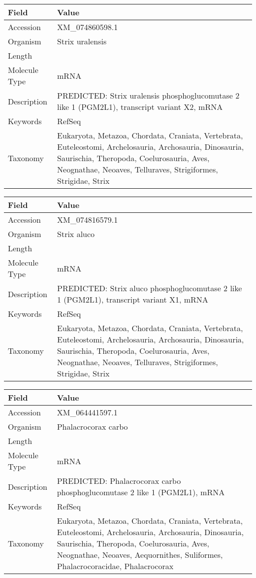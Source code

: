 \documentclass[10pt]{article}
\begin{document}
\vspace{1em}
{\footnotesize
\begin{longtable}{>{\raggedright\arraybackslash}p{4.5cm} >{\raggedright\arraybackslash}p{11.5cm}}
\textbf{Field} & \textbf{Value} \\
\hline
Accession & XM\_074860598.1 \\
Organism & Strix uralensis \\
Length & 6282 \\
Molecule Type & mRNA \\
Description & PREDICTED: Strix uralensis phosphoglucomutase 2 like 1 (PGM2L1), transcript variant X2, mRNA \\
Keywords & RefSeq \\
Taxonomy & Eukaryota, Metazoa, Chordata, Craniata, Vertebrata, Euteleostomi, Archelosauria, Archosauria, Dinosauria, Saurischia, Theropoda, Coelurosauria, Aves, Neognathae, Neoaves, Telluraves, Strigiformes, Strigidae, Strix \\
\end{longtable}
}

\vspace{1em}
{\footnotesize
\begin{longtable}{>{\raggedright\arraybackslash}p{4.5cm} >{\raggedright\arraybackslash}p{11.5cm}}
\textbf{Field} & \textbf{Value} \\
\hline
Accession & XM\_074816579.1 \\
Organism & Strix aluco \\
Length & 6473 \\
Molecule Type & mRNA \\
Description & PREDICTED: Strix aluco phosphoglucomutase 2 like 1 (PGM2L1), transcript variant X1, mRNA \\
Keywords & RefSeq \\
Taxonomy & Eukaryota, Metazoa, Chordata, Craniata, Vertebrata, Euteleostomi, Archelosauria, Archosauria, Dinosauria, Saurischia, Theropoda, Coelurosauria, Aves, Neognathae, Neoaves, Telluraves, Strigiformes, Strigidae, Strix \\
\end{longtable}
}

\vspace{1em}
{\footnotesize
\begin{longtable}{>{\raggedright\arraybackslash}p{4.5cm} >{\raggedright\arraybackslash}p{11.5cm}}
\textbf{Field} & \textbf{Value} \\
\hline
Accession & XM\_064441597.1 \\
Organism & Phalacrocorax carbo \\
Length & 6095 \\
Molecule Type & mRNA \\
Description & PREDICTED: Phalacrocorax carbo phosphoglucomutase 2 like 1 (PGM2L1), mRNA \\
Keywords & RefSeq \\
Taxonomy & Eukaryota, Metazoa, Chordata, Craniata, Vertebrata, Euteleostomi, Archelosauria, Archosauria, Dinosauria, Saurischia, Theropoda, Coelurosauria, Aves, Neognathae, Neoaves, Aequornithes, Suliformes, Phalacrocoracidae, Phalacrocorax \\
\end{longtable}
}
\end{document}
